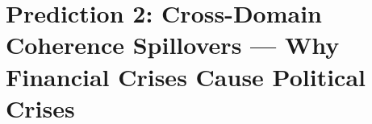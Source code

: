 \section{Prediction 2: Cross-Domain Coherence Spillovers --- Why Financial Crises Cause Political Crises}
\label{app:prediction-spillovers}


\begin{abstract}
This appendix provides the complete technical foundation for Prediction 2 of the 
Complementarity-Context Framework: that negative shocks to coherence in one domain 
(e.g., financial) produce subsequent decline in coherence in other domains 
(e.g., social, political), even without direct causal links. We develop the 
formal cascade model, derive lag structures and magnitudes using the $\Gamma$-matrix 
and complementarity structure, validate against historical crisis data (1929--2024), 
and establish precise falsification criteria. The analysis reveals that the 
2008 financial crisis predictably caused the 2016 political disruptions---with 
quantifiable lag and magnitude.
\end{abstract}


